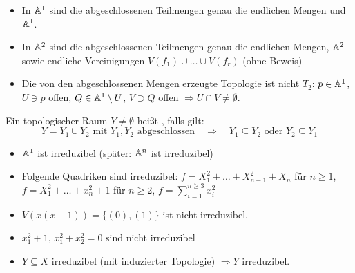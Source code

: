 \begin{bsp}
	\begin{itemize}
		\item In $\mathbb{A}^1$ sind die abgeschlossenen Teilmengen genau die endlichen Mengen und $\mathbb{A}^1$.
		\item In $\mathbb{A}^2$ sind die abgeschlossenen Teilmengen genau die endlichen Mengen, $\mathbb{A}^2$ sowie endliche Vereinigungen $V(f_1) \cup \dots \cup V(f_r)$ (ohne Beweis)
		\item Die von den abgeschlossenen Mengen erzeugte Topologie ist nicht $T_2$: $p \in \mathbb{A}^1$, $U \ni p$ offen, $Q \in \mathbb{A}^1 \setminus U$, $V \supset Q$ offen $\Rightarrow U \cap V \neq \emptyset$.
	\end{itemize}
\end{bsp}
	
\begin{defn}
	Ein topologischer Raum $Y \neq \emptyset$ heißt , falls gilt:
	\[Y = Y_1 \cup Y_2 \text{ mit } Y_1,Y_2 \text{ abgeschlossen} \quad \Rightarrow \quad Y_1 \subseteq Y_2 \text{ oder } Y_2 \subseteq Y_1 \]
\end{defn}

\begin{bsp}
	\begin{itemize}
		\item $\mathbb{A}^1$ ist irreduzibel (später: $\mathbb{A}^n$ ist irreduzibel)
		\item Folgende Quadriken sind irreduzibel: $f = X_1^2 + \dots + X_{n-1}^2 + X_n$ für $n \geq 1$, $f = X_1^2+ \dots + x_n^2 + 1$ für $n \geq 2$, $f = \sum_{i=1}^{n \geq 3} x_i^2$
		\item $V(x(x-1)) = \{ (0),(1) \}$ ist nicht irreduzibel.
		\item $x_1^2 + 1$, $x_1^2+x_2^2 = 0$ sind nicht irreduzibel
		\item $Y \subseteq X$ irreduzibel (mit induzierter Topologie) $\Rightarrow \overline{Y}$ irreduzibel.
	\end{itemize}
\end{bsp}

